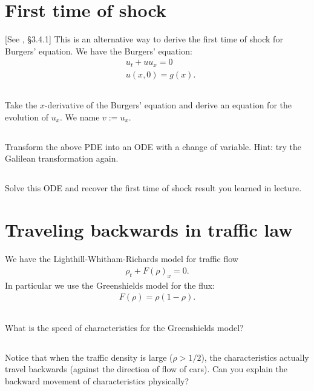 \documentclass[11pt,letterpaper]{report}
\begin{document}
\section{First time of shock}
[See \cite{ShearerLevy_15}, \S 3.4.1] This is an alternative way to derive the first time of shock for Burgers' equation. We have the Burgers' equation:
\begin{align}
    & u_t + uu_x = 0\label{eq:burgers}\\
    & u(x,0) = g(x).\nonumber
\end{align}

\subsection{}
Take the $x$-derivative of the Burgers' equation and derive an equation for the evolution of $u_x$. We name $v:= u_x$.

\subsection{}
Transform the above PDE into an ODE with a change of variable. Hint: try the Galilean transformation again.

\subsection{}
Solve this ODE and recover the first time of shock result you learned in lecture.

\section{Traveling backwards in traffic law}
We have the Lighthill-Whitham-Richards model for traffic flow
\begin{align}
    \rho_t + F(\rho)_x = 0.
\end{align}
In particular we use the Greenshields model for the flux:
\begin{align}
    F(\rho) = \rho(1-\rho).
\end{align}

\subsection{}
What is the speed of characteristics for the Greenshields model?

\subsection{}
Notice that when the traffic density is large ($\rho>1/2$), the characteristics actually travel backwards (against the direction of flow of cars). Can you explain the backward movement of characteristics physically?
\end{document}
